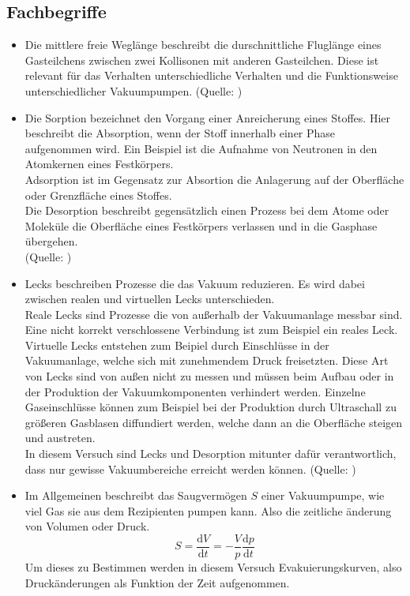 	\subsection{Fachbegriffe}
	
		\begin{itemize}
			\item
			Die mittlere freie Weglänge beschreibt die durschnittliche Fluglänge eines Gasteilchens zwischen zwei Kollisonen mit anderen Gasteilchen.
			Diese ist relevant für das Verhalten unterschiedliche Verhalten und die Funktionsweise unterschiedlicher Vakuumpumpen.
			(Quelle: \cite{wiki:mfg})

			\item
			Die Sorption bezeichnet den Vorgang einer Anreicherung eines Stoffes. 
			Hier beschreibt die Absorption, wenn der Stoff innerhalb einer Phase aufgenommen wird. 
			Ein Beispiel ist die Aufnahme von Neutronen in den Atomkernen eines Festkörpers.\\
			Adsorption ist im Gegensatz zur Absortion die Anlagerung auf der Oberfläche oder Grenzfläche eines Stoffes.\\
			Die Desorption beschreibt gegensätzlich einen Prozess bei dem Atome oder Moleküle die Oberfläche eines Festkörpers verlassen und in die Gasphase übergehen.\\
			(Quelle: \cite{wiki:sorp})
			
			\item
			Lecks beschreiben Prozesse die das Vakuum reduzieren. Es wird dabei zwischen realen und virtuellen Lecks unterschieden.\\
			Reale Lecks sind Prozesse die von außerhalb der Vakuumanlage messbar sind. Eine nicht korrekt verschlossene Verbindung ist zum Beispiel ein reales Leck.\\
			Virtuelle Lecks entstehen zum Beipiel durch Einschlüsse in der Vakuumanlage, welche sich mit zunehmendem Druck freisetzten.
			Diese Art von Lecks sind von außen nicht zu messen und müssen beim Aufbau oder in der Produktion der Vakuumkomponenten verhindert werden.
			Einzelne Gaseinschlüsse können zum Beispiel bei der Produktion durch Ultraschall zu größeren Gasblasen diffundiert werden, welche dann an die Oberfläche steigen und austreten.\\
			In diesem Versuch sind Lecks und Desorption mitunter dafür verantwortlich, dass nur gewisse Vakuumbereiche erreicht werden können. 
			(Quelle: \cite{pfeiffer:grund})

			\item
			Im Allgemeinen beschreibt das Saugvermögen $S$ einer Vakuumpumpe, wie viel Gas sie aus dem Rezipienten pumpen kann. 
			Also die zeitliche änderung von Volumen oder Druck.
			\begin{equation}
				S = \frac{\text{d}V}{\text{d}t} = - \frac{V}{p} \frac{\text{d}p}{\text{d}t}
			\end{equation}
			Um dieses zu Bestimmen werden in diesem Versuch Evakuierungskurven, also Druckänderungen als Funktion der Zeit aufgenommen.
		\end{itemize}

